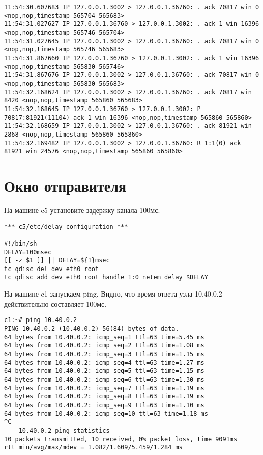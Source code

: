 \documentclass[a4paper,12pt]{article}
\begin{document}
\begin{lstlisting}
11:54:30.607683 IP 127.0.0.1.3002 > 127.0.0.1.36760: . ack 70817 win 0 <nop,nop,timestamp 565704 565683>
11:54:31.027627 IP 127.0.0.1.36760 > 127.0.0.1.3002: . ack 1 win 16396 <nop,nop,timestamp 565746 565704>
11:54:31.027645 IP 127.0.0.1.3002 > 127.0.0.1.36760: . ack 70817 win 0 <nop,nop,timestamp 565746 565683>
11:54:31.867660 IP 127.0.0.1.36760 > 127.0.0.1.3002: . ack 1 win 16396 <nop,nop,timestamp 565830 565746>
11:54:31.867676 IP 127.0.0.1.3002 > 127.0.0.1.36760: . ack 70817 win 0 <nop,nop,timestamp 565830 565683>
11:54:32.168624 IP 127.0.0.1.3002 > 127.0.0.1.36760: . ack 70817 win 8420 <nop,nop,timestamp 565860 565683>
11:54:32.168645 IP 127.0.0.1.36760 > 127.0.0.1.3002: P 70817:81921(11104) ack 1 win 16396 <nop,nop,timestamp 565860 565860>
11:54:32.168659 IP 127.0.0.1.3002 > 127.0.0.1.36760: . ack 81921 win 2868 <nop,nop,timestamp 565860 565860>
11:54:32.169482 IP 127.0.0.1.3002 > 127.0.0.1.36760: R 1:1(0) ack 81921 win 24576 <nop,nop,timestamp 565860 565860>
\end{lstlisting}

\section{Окно отправителя}

На машине c5 установите задержку канала 100мс.

\begin{lstlisting}
*** c5/etc/delay configuration ***

#!/bin/sh
DELAY=100msec
[[ -z $1 ]] || DELAY=${1}msec
tc qdisc del dev eth0 root
tc qdisc add dev eth0 root handle 1:0 netem delay $DELAY
\end{lstlisting}

На машине c1 запускаем ping. Видно, что время ответа узла 10.40.0.2 действительно составляет 100мс.
\begin{lstlisting}
c1:~# ping 10.40.0.2
PING 10.40.0.2 (10.40.0.2) 56(84) bytes of data.
64 bytes from 10.40.0.2: icmp_seq=1 ttl=63 time=5.45 ms
64 bytes from 10.40.0.2: icmp_seq=2 ttl=63 time=1.08 ms
64 bytes from 10.40.0.2: icmp_seq=3 ttl=63 time=1.15 ms
64 bytes from 10.40.0.2: icmp_seq=4 ttl=63 time=1.27 ms
64 bytes from 10.40.0.2: icmp_seq=5 ttl=63 time=1.15 ms
64 bytes from 10.40.0.2: icmp_seq=6 ttl=63 time=1.30 ms
64 bytes from 10.40.0.2: icmp_seq=7 ttl=63 time=1.19 ms
64 bytes from 10.40.0.2: icmp_seq=8 ttl=63 time=1.19 ms
64 bytes from 10.40.0.2: icmp_seq=9 ttl=63 time=1.10 ms
64 bytes from 10.40.0.2: icmp_seq=10 ttl=63 time=1.18 ms
^C
--- 10.40.0.2 ping statistics ---
10 packets transmitted, 10 received, 0% packet loss, time 9091ms
rtt min/avg/max/mdev = 1.082/1.609/5.459/1.284 ms
\end{lstlisting}
\end{document}

